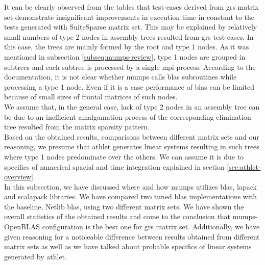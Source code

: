 It can be clearly observed from the tables that test-cases derived from \acrshort{grs} matrix set demonstrate insignificant improvements in execution time in constant to the tests generated with SuiteSparse matrix set. This may be explained by relatively small numbers of type 2 nodes in assembly trees resulted from \acrshort{grs} test-cases. In this case, the trees are mainly formed by the root and type 1 nodes. As it was mentioned in subsection \ref{subseq:mumps-review}, type 1 nodes are grouped in subtrees and each subtree is processed by a single \acrshort{mpi} process. According to the documentation, it is not clear whether \acrshort{mumps} calls \acrshort{blas} subroutines while processing a type 1 node. Even if it is a case performance of \acrshort{blas} can be limited because of small sizes of frontal matrices of such nodes.\\

We assume that, in the general case, lack of type 2 nodes in an assembly tree can be due to an inefficient amalgamation process of the corresponding elimination tree resulted from the matrix sparsity pattern.\\


Based on the obtained results, comparisons between different matrix sets and our reasoning, we presume that \acrshort{athlet} generates linear systems resulting in such trees where type 1 nodes predominate over the others. We can assume it is due to specifics of numerical spacial and time integration explained in section \ref{sec:athlet-overview}.\\


In this subsection, we have discussed where and how \acrshort{mumps} utilizes \acrshort{blas}, \acrshort{lapack}  and \acrshort{scalapack} libraries. We have compared two tuned \acrshort{blas} implementations with the baseline, Netlib \acrshort{blas}, using two different matrix sets. We have shown the overall statistics of the obtained results and come to the conclusion that \acrshort{mumps}-OpenBLAS configuration is the best one for \acrshort{grs} matrix set. Additionally, we have given reasoning for a noticeable difference between results obtained from different matrix sets as well as we have talked about probable specifics of linear systems generated by \acrshort{athlet}.\\
